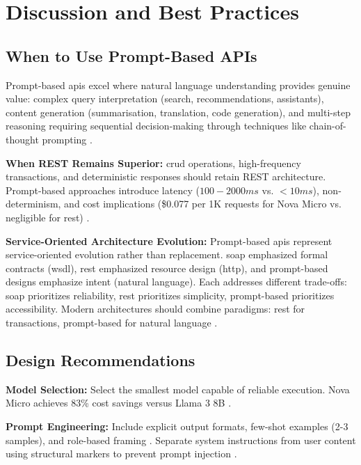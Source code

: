 \section{Discussion and Best Practices}

\subsection{When to Use Prompt-Based APIs}

Prompt-based \gls{api}s excel where natural language understanding provides genuine value: complex query interpretation (search, recommendations, assistants), content generation (summarisation, translation, code generation), and multi-step reasoning requiring sequential decision-making through techniques like chain-of-thought prompting \cite{BROWN_2020, SCHLUNTZ_2024, WEI_2022}.

\textbf{When REST Remains Superior:} \gls{crud} operations, high-frequency transactions, and deterministic responses should retain REST architecture. Prompt-based approaches introduce latency ($100-2000ms$ vs. $<10ms$), non-determinism, and cost implications (\$0.077 per 1K requests for Nova Micro vs. negligible for \gls{rest}) \cite{AWS_BEDROCK}.

\textbf{Service-Oriented Architecture Evolution:} Prompt-based \gls{api}s represent service-oriented evolution rather than replacement. \gls{soap} emphasized formal contracts (\gls{wsdl}), \gls{rest} emphasized resource design (\gls{http}), and prompt-based designs emphasize intent (natural language). Each addresses different trade-offs: \gls{soap} prioritizes reliability, \gls{rest} prioritizes simplicity, prompt-based prioritizes accessibility. Modern architectures should combine paradigms: \gls{rest} for transactions, prompt-based for natural language \cite{LERCHER_2024}.

\subsection{Design Recommendations}

\textbf{Model Selection:} Select the smallest model capable of reliable execution. Nova Micro achieves 83\% cost savings versus Llama 3 8B \cite{AWS_NOVA}.

\textbf{Prompt Engineering:} Include explicit output formats, few-shot examples (2-3 samples), and role-based framing \cite{CHEN_2025}. Separate system instructions from user content using structural markers to prevent prompt injection \cite{OWASP_2025, SCHLUNTZ_2024}.

